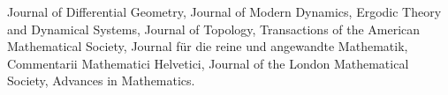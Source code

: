     \medskip

    Journal of Differential Geometry, Journal of Modern Dynamics, Ergodic Theory and Dynamical Systems, Journal of Topology, Transactions of the American Mathematical Society, Journal f\"ur die reine und angewandte Mathematik, Commentarii Mathematici Helvetici, Journal of the London Mathematical Society, Advances in Mathematics.